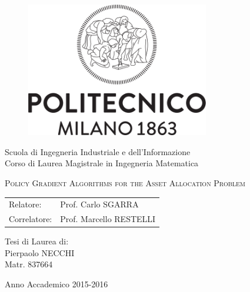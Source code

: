 \begin{titlepage}

	\begin{figure}[htpb]
		\centering
		\includegraphics[width=8cm]{Cover/polimi_name_bn}
	\end{figure}

	\begin{center}
	\vspace{1cm}
		\normalsize 
			Scuola di Ingegneria Industriale e dell'Informazione\\
      		Corso di Laurea Magistrale in Ingegneria Matematica\\
  	\vspace{1cm}
	\end{center}
	
	\begin{center}
		\LARGE
			\textsc{Policy Gradient Algorithms for the Asset Allocation Problem}
		\vspace{1.5cm}
	\end{center}

	\begin{flushleft}
		\large
		\begin{tabular}{ll}
		Relatore:    & Prof. Carlo SGARRA      \\
		Correlatore: & Prof. Marcello RESTELLI
		\end{tabular}
		\vspace{0.5cm}
	\end{flushleft}
	
	\begin{flushright}
		\large
		Tesi di Laurea di:\\
		Pierpaolo NECCHI\\
		Matr. 837664\\		
	\end{flushright}
	
	\vspace*{\fill}
	\begin{center}
		Anno Accademico 2015-2016
	\end{center}
	
\end{titlepage}
